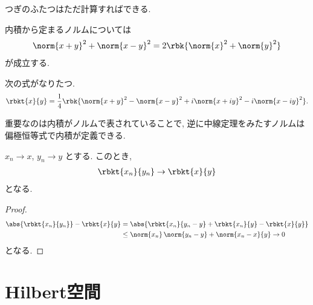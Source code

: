 \documentclass[openany, a4paper, oneside]{jsbook}
\begin{document}
つぎのふたつはただ計算すればできる.
\begin{prop}[中線定理]
 内積から定まるノルムについては
 \begin{align}
  \norm{x + y}^2 + \norm{x - y}^2
  =
  2 \rbk{\norm{x}^2 + \norm{y}^2}
 \end{align}
 が成立する.
\end{prop}
\begin{prop}[偏極恒等式]
次の式がなりたつ.
\begin{align}
 \rbkt{x}{y}
 =
 \frac{1}{4}\rbk{\norm{x + y}^2 - \norm{x - y}^2 + i \norm{x + iy}^2 - i \norm{x - iy}^2}.
\end{align}
\end{prop}
\begin{rem}
重要なのは内積がノルムで表されていることで,
逆に中線定理をみたすノルムは偏極恒等式で内積が定義できる.
\end{rem}

\begin{prop}[内積の連続性]
 $x_n \to x$, $y_n \to y$ とする.
 このとき,
 \begin{align}
  \rbkt{x_n}{y_n} \to \rbkt{x}{y}
 \end{align}
 となる.
\end{prop}
\begin{proof}
\begin{align}
 \abs{\rbkt{x_n}{y_n}} - \rbkt{x}{y}
 &=
 \abs{\rbkt{x_n}{y_n - y} + \rbkt{x_n}{y} - \rbkt{x}{y}} \\
 &\le
 \norm{x_n} \, \norm{y_n - y} + \norm{x_n - x}{y} \to 0
\end{align}
となる.
\end{proof}
\section{Hilbert空間}
\end{document}

